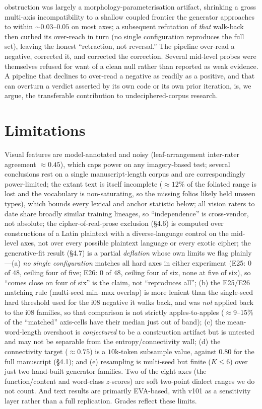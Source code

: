\documentclass[11pt]{article}
\begin{document}
obstruction was largely a morphology-parameterisation artifact, shrinking a gross
multi-axis incompatibility to a shallow coupled frontier the generator approaches to within
$\sim\!0.03$--$0.05$ on most axes; a subsequent refutation of \emph{that} walk-back then
curbed its over-reach in turn (no single configuration reproduces the full set), leaving the
honest ``retraction, not reversal.'' The pipeline over-read a negative, corrected it, and
corrected the correction. Several mid-level
probes were themselves refused for want of a clean null rather than reported as weak
evidence. A pipeline that declines to over-read a negative as readily as a positive, and
that can overturn a
verdict asserted by its own code or its own prior iteration, is, we argue, the
transferable contribution to undeciphered-corpus research.

\section{Limitations}
Visual features are model-annotated and noisy (leaf-arrangement inter-rater agreement
$\approx 0.45$), which caps power on any imagery-based test; several conclusions rest
on a single manuscript-length corpus and are correspondingly power-limited; the extant
text is itself incomplete ($\approx\!12\%$ of the foliated range is lost and the
vocabulary is non-saturating, so the missing folios likely held unseen types), which
bounds every lexical and anchor statistic below; all vision raters to date share
broadly similar training lineages, so ``independence'' is cross-vendor, not absolute;
the cipher-of-real-prose exclusion (\S4.6) is computed over constructions of a Latin
plaintext with a diverse-language control on the mid-level axes, not over every possible
plaintext language or every exotic cipher; the generative-fit result (\S4.7) is a partial
\emph{deflation} whose own limits we flag plainly---(a) \emph{no single configuration}
matches all hard axes in either experiment (E25: $0$ of $48$, ceiling four of five; E26: $0$
of $48$, ceiling four of six, none at five of six), so ``comes close on four of six'' is the
claim, not ``reproduces all''; (b) the E25/E26 matching rule (multi-seed min--max
overlap) is more lenient than the single-seed hard threshold used for the i08 negative it
walks back, and was \emph{not} applied back to the i08 families, so that comparison is not
strictly apples-to-apples ($\approx$9--15\% of the ``matched'' axis-cells have their median
just out of band); (c) the mean-word-length overshoot is \emph{conjectured} to be a
construction artifact but is untested and may not be separable from the
entropy/connectivity wall; (d) the connectivity target ($\approx 0.75$) is a $10$k-token
subsample value, against $0.80$ for the full manuscript (\S4.1); and (e) resampling is
multi-seed but finite ($K\!\leq\!6$) over just two hand-built generator families. Two of the
eight axes (the function/content and word-class $z$-scores) are soft two-point dialect
ranges we do not count. And text results are primarily EVA-based,
with v101 as a sensitivity layer rather than a full replication. Grades reflect these
limits.
\end{document}
